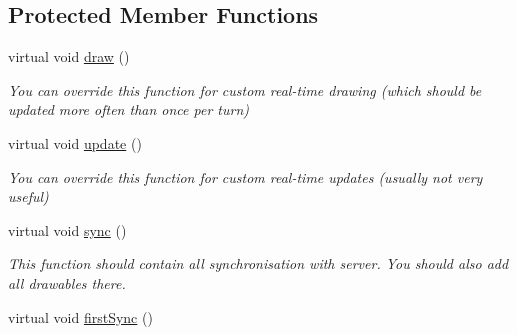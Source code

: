 \subsection*{Protected Member Functions}
\begin{DoxyCompactItemize}
\item 
virtual void \hyperlink{classGame_a03387676134dd331f4a1902349926816}{draw} ()\hypertarget{classGame_a03387676134dd331f4a1902349926816}{}\label{classGame_a03387676134dd331f4a1902349926816}

\begin{DoxyCompactList}\small\item\em You can override this function for custom real-\/time drawing (which should be updated more often than once per turn) \end{DoxyCompactList}\item 
virtual void \hyperlink{classGame_a51e7f9bfbb9a2d29525b6ea009ebc345}{update} ()\hypertarget{classGame_a51e7f9bfbb9a2d29525b6ea009ebc345}{}\label{classGame_a51e7f9bfbb9a2d29525b6ea009ebc345}

\begin{DoxyCompactList}\small\item\em You can override this function for custom real-\/time updates (usually not very useful) \end{DoxyCompactList}\item 
virtual void \hyperlink{classGame_aab44617eccac431efb47e8737740b9f6}{sync} ()\hypertarget{classGame_aab44617eccac431efb47e8737740b9f6}{}\label{classGame_aab44617eccac431efb47e8737740b9f6}

\begin{DoxyCompactList}\small\item\em This function should contain all synchronisation with server. You should also add all drawables there. \end{DoxyCompactList}\item 
virtual void \hyperlink{classGame_a91de9baa89af357070ccee44c6f0a21e}{first\+Sync} ()\hypertarget{classGame_a91de9baa89af357070ccee44c6f0a21e}{}\label{classGame_a91de9baa89af357070ccee44c6f0a21e}


\end{DoxyCompactItemize}
